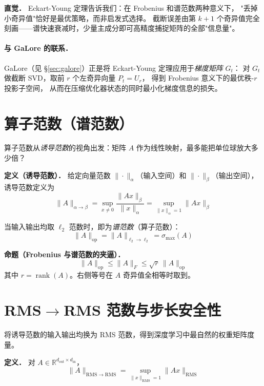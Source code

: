 \documentclass[12pt, a4paper]{article}
\newcommand{\RMS}{\mathrm{RMS}}
\newcommand{\op}{\mathrm{op}}
\begin{document}
\begin{rembox}
\textbf{直觉．} Eckart-Young 定理告诉我们：在 Frobenius 和谱范数两种意义下，
"丢掉小奇异值"恰好是最优策略，而非启发式选择。
截断误差由第 $k+1$ 个奇异值完全刻画——谱快速衰减时，少量主成分即可高精度捕捉矩阵的全部"信息量"。
\end{rembox}

\paragraph{与 GaLore 的联系．}
GaLore（见 §\ref{sec:galore}）正是将 Eckart-Young 定理应用于\emph{梯度矩阵} $G_t$：
对 $G_t$ 做截断 SVD，取前 $r$ 个左奇异向量 $P_t = U_r$，
得到 Frobenius 意义下的最优秩-$r$ 投影子空间，
从而在压缩优化器状态的同时最小化梯度信息的损失。

\section{算子范数（谱范数）}

算子范数从\emph{诱导范数}的视角出发：矩阵 $A$ 作为线性映射，最多能把单位球放大多少倍？

\begin{defbox}
\textbf{定义（诱导范数）．} 给定向量范数 $\|\cdot\|_\alpha$（输入空间）和 $\|\cdot\|_\beta$（输出空间），
诱导范数定义为
\[
  \|A\|_{\alpha \to \beta}
  = \sup_{x \neq 0} \frac{\|Ax\|_\beta}{\|x\|_\alpha}
  = \sup_{\|x\|_\alpha = 1} \|Ax\|_\beta
\]
\end{defbox}

当输入输出均取 $\ell_2$ 范数时，即为\emph{谱范数}（算子范数）：
\[
  \|A\|_{\op} = \|A\|_{\ell_2 \to \ell_2} = \sigma_{\max}(A)
\]

\begin{propbox}
\textbf{命题（Frobenius 与谱范数的夹逼）．}
\[
  \|A\|_{\op} \leq \|A\|_F \leq \sqrt{r}\,\|A\|_{\op}
\]
其中 $r = \operatorname{rank}(A)$。右侧等号在 $A$ 奇异值全相等时取到。
\end{propbox}

\section{RMS$\to$RMS 范数与步长安全性}

将诱导范数的输入输出均换为 RMS 范数，得到深度学习中最自然的权重矩阵度量。

\begin{defbox}
\textbf{定义．} 对 $A \in \mathbb{R}^{d_{\mathrm{out}} \times d_{\mathrm{in}}}$，
\[
  \|A\|_{\RMS\to\RMS}
  = \sup_{\|x\|_{\RMS}=1} \|Ax\|_{\RMS}
\]
\end{defbox}
\end{document}
